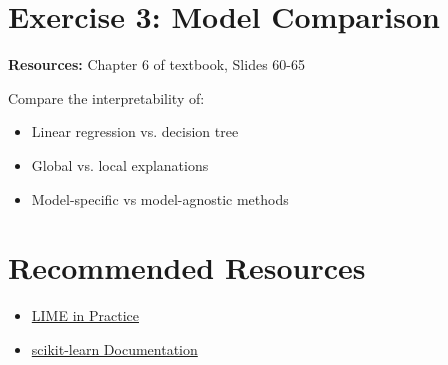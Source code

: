 \section*{Exercise 3: Model Comparison}
\textbf{Resources:} Chapter 6 of textbook, Slides 60-65

Compare the interpretability of:
\begin{itemize}
\item Linear regression vs. decision tree
\item Global vs. local explanations
\item Model-specific vs model-agnostic methods
\end{itemize}


\section*{Recommended Resources}
\begin{itemize}
\item \href{https://christophm.github.io/interpretable-ml-book/limo.html}{LIME in Practice}
\item \href{https://scikit-learn.org/stable/}{scikit-learn Documentation}
\end{itemize}
